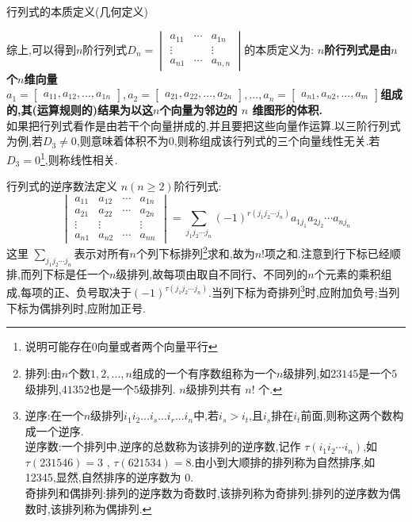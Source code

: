 \documentclass[8pt a4paper, oneside, UTF8]{ctexbook}
\begin{document}
\begin{sloppypar}
\begin{defn}{行列式的本质定义(几何定义)}{}
\begin{center}
    \end{center}
    综上,可以得到$n$阶行列式$D_n=
    \begin{vmatrix}
        a_{11} & \cdots &a_{1n}\\ 
        \vdots &        & \vdots\\
        a_{n1} & \cdots & a_{n,n}
    \end{vmatrix}$的本质定义为:
    \textbf{$n$阶行列式是由$n$个$n$维向量$a_1=\begin{bmatrix}a_{11},a_{12},...,a_{1n}\end{bmatrix},a_2=\begin{bmatrix}a_{21},a_{22},...,a_{2n}\end{bmatrix},...,a_n=\begin{bmatrix}a_{n1},a_{n2},...,a_m\end{bmatrix}$组成的,其(运算规则的)结果为以这$n$个向量为邻边的 $n$ 维图形的体积.}\\
    如果把行列式看作是由若干个向量拼成的,并且要把这些向量作运算.以三阶行列式为例,若$D_3 \neq 0$,则意味着体积不为0,则称组成该行列式的三个向量线性无关.若$D_3 =0$\footnote{说明可能存在0向量或者两个向量平行},则称线性相关.
    \end{defn}
    \begin{defn}{行列式的逆序数法定义}{}
    $n(n\geqslant2)$阶行列式:$$\begin{vmatrix}a_{11}&a_{12}&\cdots&a_{1n}\\a_{21}&a_{22}&\cdots&a_{2n}\\\vdots&\vdots&&\vdots\\a_{n1}&a_{n2}&\cdots&a_{nn}\end{vmatrix}=\sum_{j_{1}j_{2}\cdots j_{n}}(-1)^{r(j_{1}j_{2}\cdots j_{n})}a_{1j_{1}}a_{2j_{2}}\cdots a_{nj_{n}}$$
    这里 $\sum_{j_1j_2\cdots j_n} $表示对所有$n$个列下标排列\footnote{排列:由$n$个数$1,2,...,n$组成的一个有序数组称为一个$n$级排列,如$23145$是一个$5$级排列,$41352$也是一个$5$级排列. $n$级排列共有 $n!$ 个.}求和,故为$n!$项之和.注意到行下标已经顺排,而列下标是任一个$n$级排列,故每项由取自不同行、不同列的$n$个元素的乘积组成,每项的正、负号取决于$(-1)^{\tau(j_1j_2\cdots j_n)}$.当列下标为奇排列\footnote{逆序:在一个$n$级排列$i_1i_2...i_s...i_r...i_n$中,若$i_s>i_t$,且$i_{s}$排在$i_{t}$前面,则称这两个数构成一个逆序.\\逆序数:一个排列中,逆序的总数称为该排列的逆序数,记作 $\tau(i_1i_2\cdots i_n)$,如 $\tau(231546)=3$ , $\tau(621534)=8$.由小到大顺排的排列称为自然排序,如 12345,显然,自然排序的逆序数为 0.\\奇排列和偶排列:排列的逆序数为奇数时,该排列称为奇排列;排列的逆序数为偶数时,该排列称为偶排列.}时,应附加负号;当列下标为偶排列时,应附加正号.

\end{defn}
\end{sloppypar}
\end{document}
